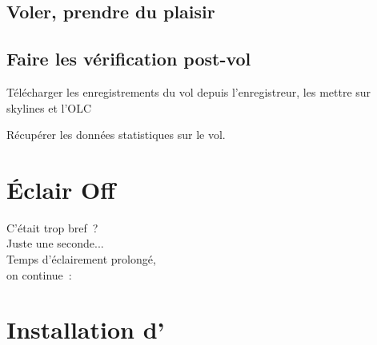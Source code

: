 \documentclass[french, a4paper, 12pt]{refrep}
\begin{document}
\subsection*{\textcolor{flashblue}{Voler, prendre du plaisir}}

\subsection*{\textcolor{flashblue}{Faire les vérification post-vol}}
\begin{compactitem}
\item Télécharger les enregistrements du vol depuis l'enregistreur, les mettre sur skylines et l'OLC
\item Récupérer les données statistiques sur le vol.
\end{compactitem}

\section*{{\color[rgb]{.9,.85,0}Éclair} Off}

\hspace*{1cm} C'était trop bref~?\\
\hspace*{4cm} Juste une seconde...\\
\hspace*{6cm} Temps d'éclairement prolongé,\\
\hspace*{10cm} on continue~:


\setlength{\parskip}{0.3\baselineskip}
\newpage
\section{Installation d'\xc}\label{ch:XCSinstall}

\end{document}
